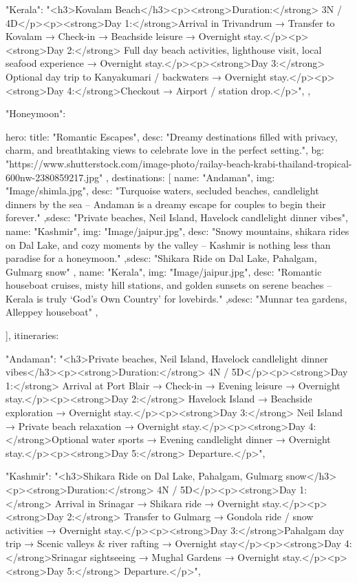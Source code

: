 {{{      "Kerala": "<h3>Kovalam Beach</h3><p><strong>Duration:</strong> 3N / 4D</p><p><strong>Day 1:</strong>Arrival in Trivandrum → Transfer to Kovalam → Check-in → Beachside leisure → Overnight stay.</p><p><strong>Day 2:</strong> Full day beach activities, lighthouse visit, local seafood experience → Overnight stay.</p><p><strong>Day 3:</strong> Optional day trip to Kanyakumari / backwaters → Overnight stay.</p><p><strong>Day 4:</strong>Checkout → Airport / station drop.</p>",
    }
  },

   "Honeymoon": {
    hero: {
      title: "Romantic Escapes",
      desc: "Dreamy destinations filled with privacy, charm, and breathtaking views to celebrate love in the perfect setting.",
      bg: "https://www.shutterstock.com/image-photo/railay-beach-krabi-thailand-tropical-600nw-2380859217.jpg"
    },
    destinations: [
      { name: "Andaman", img: "Image/shimla.jpg", desc: "Turquoise waters, secluded beaches, candlelight dinners by the sea – Andaman is a dreamy escape for couples to begin their forever." ,sdesc: "Private beaches, Neil Island, Havelock candlelight dinner vibes"},
      { name: "Kashmir", img: "Image/jaipur.jpg", desc: "Snowy mountains, shikara rides on Dal Lake, and cozy moments by the valley – Kashmir is nothing less than paradise for a honeymoon." ,sdesc: "Shikara Ride on Dal Lake, Pahalgam, Gulmarg snow" },
      { name: "Kerala", img: "Image/jaipur.jpg", desc: "Romantic houseboat cruises, misty hill stations, and golden sunsets on serene beaches – Kerala is truly ‘God’s Own Country’ for lovebirds." ,sdesc: "Munnar tea gardens, Alleppey houseboat" },
     
    ],
    itineraries: {
      "Andaman": "<h3>Private beaches, Neil Island, Havelock candlelight dinner vibes</h3><p><strong>Duration:</strong> 4N / 5D</p><p><strong>Day 1:</strong> Arrival at Port Blair → Check-in → Evening leisure → Overnight stay.</p><p><strong>Day 2:</strong> Havelock Island → Beachside exploration → Overnight stay.</p><p><strong>Day 3:</strong> Neil Island → Private beach relaxation → Overnight stay.</p><p><strong>Day 4:</strong>Optional water sports → Evening candlelight dinner → Overnight stay.</p><p><strong>Day 5:</strong> Departure.</p>",

      "Kashmir": "<h3>Shikara Ride on Dal Lake, Pahalgam, Gulmarg snow</h3><p><strong>Duration:</strong> 4N / 5D</p><p><strong>Day 1:</strong> Arrival in Srinagar → Shikara ride → Overnight stay.</p><p><strong>Day 2:</strong> Transfer to Gulmarg → Gondola ride / snow activities → Overnight stay.</p><p><strong>Day 3:</strong>Pahalgam day trip → Scenic valleys & river rafting → Overnight stay</p><p><strong>Day 4:</strong>Srinagar sightseeing → Mughal Gardens → Overnight stay.</p><p><strong>Day 5:</strong> Departure.</p>",

}}}
